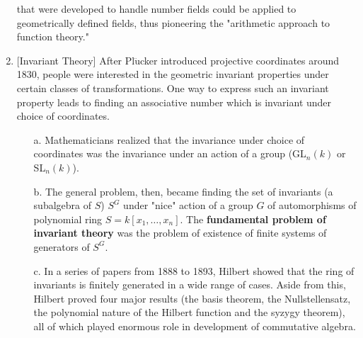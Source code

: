 \begin{enumerate}
            that were developed to handle number fields could be applied to geometrically defined fields, thus
            pioneering the "arithmetic approach to function theory."
      \item
            $[$Invariant Theory]
                  After Pl$\ddot{\text{u}}$cker introduced projective coordinates around 1830, people were
            interested in the geometric invariant properties under certain classes of transformations. One way to
            express such an invariant property leads to finding an associative number which is invariant under
            choice of coordinates.
            \begin{enumerate}
                  \item[a.]
                        Mathematicians realized that the invariance under choice of coordinates was the invariance
                        under an action of a group (GL$_n(k)$ or SL$_n(k)$).
                  \item[b.]
                        The general problem, then, became finding the set of invariants (a subalgebra of $S$) $S^G$ under
                        "nice" action of a group $G$ of automorphisms of polynomial ring $S=k[x_1,\ldots,x_n]$.
                        The \textbf{fundamental problem of invariant theory} was the problem of existence of
                        finite systems of generators of $S^G$.
                  \item[c.]
                        In a series of papers from 1888 to 1893, Hilbert showed that the ring of invariants is finitely
                        generated in a wide range of cases. Aside from this, Hilbert proved four major results (the basis
                        theorem, the Nullstellensatz, the polynomial nature of the Hilbert function and the syzygy theorem),
                        all of which played enormous role in development of commutative algebra.
            \end{enumerate}


\end{enumerate}

